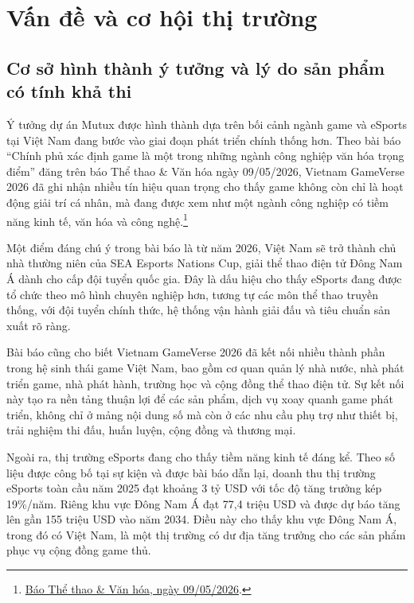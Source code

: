 \section{Vấn đề và cơ hội thị trường}

\subsection{Cơ sở hình thành ý tưởng và lý do sản phẩm có tính khả thi}

Ý tưởng dự án Mutux được hình thành dựa trên bối cảnh ngành game và eSports tại Việt Nam đang bước vào giai đoạn phát triển chính thống hơn. Theo bài báo ``Chính phủ xác định game là một trong những ngành công nghiệp văn hóa trọng điểm'' đăng trên báo Thể thao \& Văn hóa ngày 09/05/2026, Vietnam GameVerse 2026 đã ghi nhận nhiều tín hiệu quan trọng cho thấy game không còn chỉ là hoạt động giải trí cá nhân, mà đang được xem như một ngành công nghiệp có tiềm năng kinh tế, văn hóa và công nghệ.\footnote{\href{https://thethaovanhoa.vn/chinh-phu-xac-dinh-game-la-mot-trong-nhung-nganh-cong-nghiep-van-hoa-trong-diem-20260509142546065.htm}{Báo Thể thao \& Văn hóa, ngày 09/05/2026}.}

Một điểm đáng chú ý trong bài báo là từ năm 2026, Việt Nam sẽ trở thành chủ nhà thường niên của SEA Esports Nations Cup, giải thể thao điện tử Đông Nam Á dành cho cấp đội tuyển quốc gia. Đây là dấu hiệu cho thấy eSports đang được tổ chức theo mô hình chuyên nghiệp hơn, tương tự các môn thể thao truyền thống, với đội tuyển chính thức, hệ thống vận hành giải đấu và tiêu chuẩn sản xuất rõ ràng.

Bài báo cũng cho biết Vietnam GameVerse 2026 đã kết nối nhiều thành phần trong hệ sinh thái game Việt Nam, bao gồm cơ quan quản lý nhà nước, nhà phát triển game, nhà phát hành, trường học và cộng đồng thể thao điện tử. Sự kết nối này tạo ra nền tảng thuận lợi để các sản phẩm, dịch vụ xoay quanh game phát triển, không chỉ ở mảng nội dung số mà còn ở các nhu cầu phụ trợ như thiết bị, trải nghiệm thi đấu, huấn luyện, cộng đồng và thương mại.

Ngoài ra, thị trường eSports đang cho thấy tiềm năng kinh tế đáng kể. Theo số liệu được công bố tại sự kiện và được bài báo dẫn lại, doanh thu thị trường eSports toàn cầu năm 2025 đạt khoảng 3 tỷ USD với tốc độ tăng trưởng kép 19\%/năm. Riêng khu vực Đông Nam Á đạt 77,4 triệu USD và được dự báo tăng lên gần 155 triệu USD vào năm 2034. Điều này cho thấy khu vực Đông Nam Á, trong đó có Việt Nam, là một thị trường có dư địa tăng trưởng cho các sản phẩm phục vụ cộng đồng game thủ.

